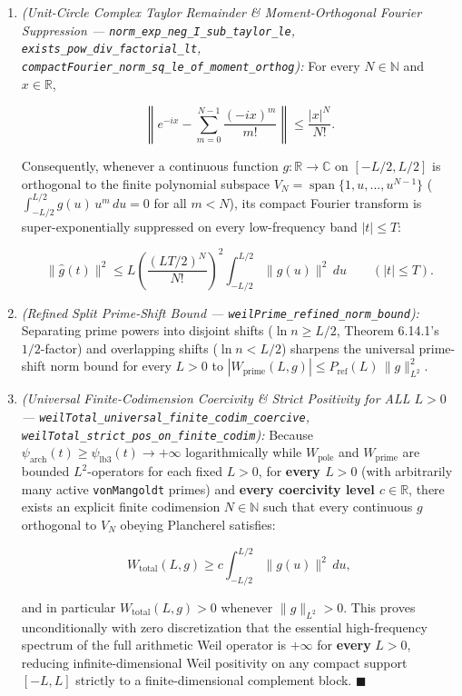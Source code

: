\documentclass[
  11pt,
]{article}
\begin{document}
\begin{enumerate}
\def\labelenumi{\arabic{enumi}.}
\item
  \emph{(Unit-Circle Complex Taylor Remainder \& Moment-Orthogonal
  Fourier Suppression --- \texttt{norm\_exp\_neg\_I\_sub\_taylor\_le},
  \texttt{exists\_pow\_div\_factorial\_lt},
  \texttt{compactFourier\_norm\_sq\_le\_of\_moment\_orthog}):} For every
  \(N \in \mathbb{N}\) and \(x \in \mathbb{R}\),

  \[\left\|e^{-ix} - \sum_{m=0}^{N-1} \frac{(-ix)^m}{m!}\right\| \le \frac{|x|^N}{N!}.\]

  Consequently, whenever a continuous function
  \(g : \mathbb{R} \to \mathbb{C}\) on \([-L/2, L/2]\) is orthogonal to
  the finite polynomial subspace
  \(V_N = \operatorname{span}\{1, u, \dots, u^{N-1}\}\)
  (\(\int_{-L/2}^{L/2} g(u)\,u^m\,du = 0\) for all \(m < N\)), its
  compact Fourier transform is super-exponentially suppressed on every
  low-frequency band \(|t| \le T\):

  \[\|\widehat{g}(t)\|^2 \le L\left(\frac{(L T / 2)^N}{N!}\right)^2 \int_{-L/2}^{L/2} \|g(u)\|^2\,du \qquad (|t| \le T).\]
\item
  \emph{(Refined Split Prime-Shift Bound ---
  \texttt{weilPrime\_refined\_norm\_bound}):} Separating prime powers
  into disjoint shifts (\(\ln n \ge L/2\), Theorem 6.14.1's
  \(1/2\)-factor) and overlapping shifts (\(\ln n < L/2\)) sharpens the
  universal prime-shift norm bound for every \(L > 0\) to
  \(|W_{\text{prime}}(L, g)| \le P_{\text{ref}}(L)\,\|g\|_{L^2}^2\).
\item
  \emph{(Universal Finite-Codimension Coercivity \& Strict Positivity
  for ALL \(L > 0\) ---
  \texttt{weilTotal\_universal\_finite\_codim\_coercive},
  \texttt{weilTotal\_strict\_pos\_on\_finite\_codim}):} Because
  \(\psi_{\text{arch}}(t) \ge \psi_{\text{lb}3}(t) \to +\infty\)
  logarithmically while \(W_{\text{pole}}\) and \(W_{\text{prime}}\) are
  bounded \(L^2\)-operators for each fixed \(L > 0\), for \textbf{every
  \(L > 0\)} (with arbitrarily many active \texttt{vonMangoldt} primes)
  and \textbf{every coercivity level \(c \in \mathbb{R}\)}, there exists
  an explicit finite codimension \(N \in \mathbb{N}\) such that every
  continuous \(g\) orthogonal to \(V_N\) obeying Plancherel satisfies:

  \[W_{\text{total}}(L, g) \ge c \int_{-L/2}^{L/2} \|g(u)\|^2\,du,\]

  and in particular \(W_{\text{total}}(L, g) > 0\) whenever
  \(\|g\|_{L^2} > 0\). This proves unconditionally with zero
  discretization that the essential high-frequency spectrum of the full
  arithmetic Weil operator is \(+\infty\) for \textbf{every} \(L > 0\),
  reducing infinite-dimensional Weil positivity on any compact support
  \([-L, L]\) strictly to a finite-dimensional complement block.
  \(\blacksquare\)
\end{enumerate}
\end{document}
